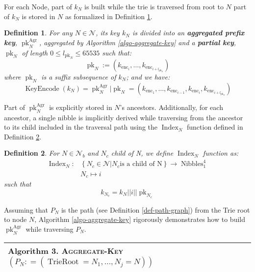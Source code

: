 \documentclass{article}
\newcommand{\assign}{:=}
\newcommand{\tmname}[1]{\textsc{#1}}
\newcommand{\tmop}[1]{\ensuremath{\operatorname{#1}}}
\newcommand{\tmstrong}[1]{\textbf{#1}}
\newcommand{\tmtextbf}[1]{{\bfseries{#1}}}
\newcommand{\tmtextsc}[1]{{\scshape{#1}}}
\newcounter{tmcounter}
\newcommand{\custombinding}[1]{%
  \setcounter{tmcounter}{#1}%
  \addtocounter{tmcounter}{-1}%
  \refstepcounter{tmcounter}}
\newtheorem{definition}{Definition}
\providecommand{\tmname}[1]{\tmtextsc{#1}}
\providecommand{\tmop}[1]{\ensuremath{\mathrm{#1}}}
\providecommand{\tmstrong}[1]{\tmtextbf{#1}}
\providecommand{\tmtextbf}[1]{\tmtextbf{#1}}
\newtheorem{definition}{Definition}
\begin{document}
For each Node, part of $k_N$ is built while the trie is traversed from root to
$N$ part of $k_N$ is stored in $N$ as formalized in Definition
\ref{defn-node-key}.

\begin{definition}
  \label{defn-node-key}For any $N \in \mathcal{N}$, its key $k_N$ is divided
  into an {\tmstrong{aggregated prefix key}},
  {\tmstrong{$\tmop{pk}_N^{\tmop{Agr}}$}}, aggregated by Algorithm
  \ref{algo-aggregate-key} and a {\tmstrong{partial key}},
  {\tmstrong{$\tmop{pk}_N$}} of length $0 \leqslant l_{\tmop{pk}_N} \leqslant
  65535$ such that:
  \[ \tmop{pk}_N \assign (k_{\tmop{enc}_i}, \ldots, k_{\tmop{enc}_{i +
     l_{\tmop{pk}_N}}}) \]
  where $\tmop{pk}_N$ is a suffix subsequence of $k_N$; and we have:
  \[ \tmop{KeyEncode} (k_N) = \tmop{pk}_N^{\tmop{Agr}} | \tmop{pk}_N =
     (k_{\tmop{enc}_1}, \ldots, k_{\tmop{enc}_{i - 1}}, k_{\tmop{enc}_i},
     k_{\tmop{enc}_{i + l_{\tmop{pk}_N}}}) \]
\end{definition}

Part of $\tmop{pk}_N^{\tmop{Agr}}$ is explicitly stored in $N$'s ancestors.
Additionally, for each ancestor, a single nibble is implicitly derived while
traversing from the ancestor to its child included in the traversal path using
the $\tmop{Index}_N$ function defined in Definition \ref{defn-index-function}.

\begin{definition}
  \label{defn-index-function}For $N \in \mathcal{N}_b$ and $N_c$ child of N,
  we define {\tmstrong{$\tmop{Index}_N$}} function as:
  \[ \begin{array}{cc}
       \tmop{Index}_N : & \left\{ N_c \in \mathcal{N}|N_c  \text{is a child of
       N} \right\} \rightarrow \tmop{Nibbles}^4_1\\
       & N_c \mapsto i_{}
     \end{array} \]
  such that
  \[ k_{N_c} = k_N | | i | | \tmop{pk}_{N_c} \]
\end{definition}

Assuming that $P_N$ is the path (see Definition \ref{def-path-graph}) from the
Trie root to node $N$, Algorithm \ref{algo-aggregate-key} rigorously
demonstrates how to build $\tmop{pk}^{\tmop{Agr}}_N$ while traversing $P_N$.

\custombinding{3}{\noindent}\begin{tabular}{l}
  \hline
  \tmtextbf{Algorithm  3. }
  \label{algo-aggregate-key}{\tmname{Aggregate-Key}}$(P_N : = (\tmop{TrieRoot}
  = N_1, \ldots, N_j = N))$\\
  \hline
\end{tabular}
\end{document}
